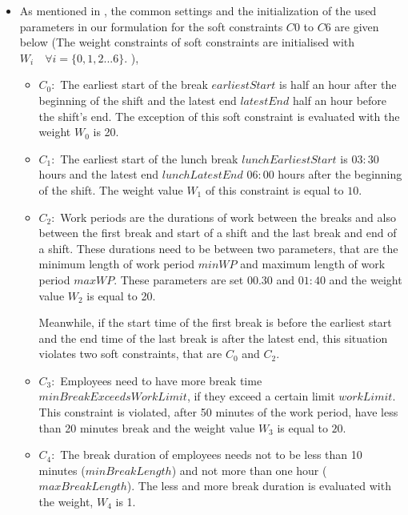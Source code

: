 \begin{itemize}
\item As mentioned in \cite{li:2010:beer}, the common settings and the initialization of the used parameters in our formulation for the soft constraints $C0$ to $C6$ are given below (The weight constraints of soft constraints are initialised with $W_i \quad \forall i = \{ 0, 1, 2...6 \}$. ),

\begin{itemize}
\item $C_0 : $ The earliest start of the break $earliestStart$ is half an hour after the beginning of the shift and the latest end $latestEnd$ half an hour before the shift's end. The exception of this soft constraint is evaluated with the weight $W_0$ is 20. \\

\item $C_1 : $ The earliest start of the lunch break $lunchEarliestStart$ is $03:30$ hours and the latest end $lunchLatestEnd$ $06:00$ hours after the beginning of the shift. The weight value  $W_1$ of this constraint is equal to $10$. \\

\item $C_2 : $ Work periods are the durations of work between the breaks and also between the first break and start of a shift and the last break and end of a shift. These durations need to be between two parameters, that are the minimum length of work period $minWP$ and maximum length of work period $maxWP$. These parameters are set $00.30$ and $01:40$ and the weight value $W_2$ is equal to 20.  

Meanwhile, if the start time of the first break is before the earliest start and the end time of the last break is after the latest end, this situation violates two soft constraints, that are $C_0$ and $C_2$. \\

\item $C_3 : $ Employees need to have more break time $minBreakExceedsWorkLimit$, if they exceed a certain limit $workLimit$. This constraint is violated, after 50 minutes of the work period, have less than 20 minutes break and the weight value $W_3$ is equal to $20$.  \\

\item $C_4 : $ The break duration of employees needs not to be  less than 10 minutes ($minBreakLength$) and not more than one hour ($maxBreakLength$). The less and more break duration is evaluated with the weight, $W_4$ is 1. \\


\end{itemize}
\end{itemize}
